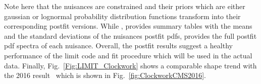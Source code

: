 \begin{spacing}{2}
Note here that the nuisances are constrained and their priors which are either gaussian or lognormal probability distribution functions transform into their corresponding postfit versions. While \COMBINE, provides summary tables with the means and the standard deviations of the nuisances postfit pdfs, \THETA provides the full postfit pdf spectra of each nuisance. Overall, the postfit results suggest a healthy performance of the limit code and fit procedure which will be used in the actual data. Finally, Fig.~\ref{Fig:LIMIT_Clockwork} shows a comparable shape trend with the 2016 result~\cite{cmsdiphoton2016} which is shown in Fig.~\ref{fig:ClockworkCMS2016}.






\end{spacing}
